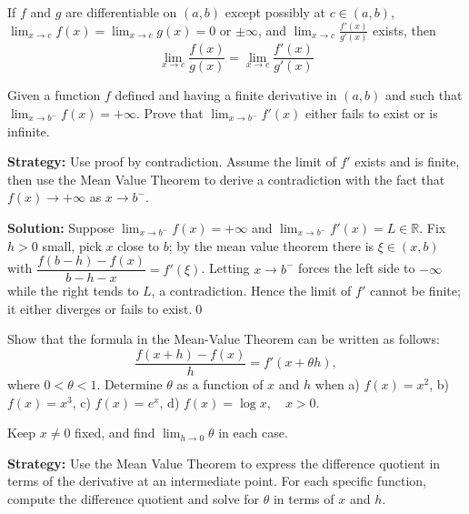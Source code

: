 \begin{theorem}
If $f$ and $g$ are differentiable on $(a,b)$ except possibly at $c \in (a,b)$, $\lim_{x \to c} f(x) = \lim_{x \to c} g(x) = 0$ or $\pm\infty$, and $\lim_{x \to c} \frac{f'(x)}{g'(x)}$ exists, then
\[ \lim_{x \to c} \frac{f(x)}{g(x)} = \lim_{x \to c} \frac{f'(x)}{g'(x)} \]
\end{theorem}

\begin{problembox}
\begin{problemstatement}
Given a function \( f \) defined and having a finite derivative in \( (a, b) \) and such that \( \lim_{x \to b^-} f(x) = +\infty \). Prove that \( \lim_{x \to b^-} f'(x) \) either fails to exist or is infinite.
\end{problemstatement}
\end{problembox}

\noindent\textbf{Strategy:} Use proof by contradiction. Assume the limit of \( f' \) exists and is finite, then use the Mean Value Theorem to derive a contradiction with the fact that \( f(x) \to +\infty \) as \( x \to b^- \).

\bigskip\noindent\textbf{Solution:}
Suppose $\lim_{x\to b^-}f(x)=+\infty$ and $\lim_{x\to b^-}f'(x)=L\in\mathbb{R}$. Fix $h>0$ small, pick $x$ close to $b$; by the mean value theorem there is $\xi\in(x,b)$ with $\dfrac{f(b-h)-f(x)}{b-h-x}=f'(\xi)$. Letting $x\to b^-$ forces the left side to $-\infty$ while the right tends to $L$, a contradiction. Hence the limit of $f'$ cannot be finite; it either diverges or fails to exist.\qed


\begin{problembox}
\begin{problemstatement}
Show that the formula in the Mean-Value Theorem can be written as follows:
\[ \frac{f(x+h)-f(x)}{h} = f'(x+\theta h), \]
where \( 0 < \theta < 1 \). Determine \( \theta \) as a function of \( x \) and \( h \) when 
a) \( f(x) = x^2 \), 
b) \( f(x) = x^3 \), 
c) \( f(x) = e^x \), 
d) \( f(x) = \log x, \quad x > 0 \).

Keep \( x \neq 0 \) fixed, and find \( \lim_{h \to 0} \theta \) in each case.
\end{problemstatement}
\end{problembox}

\noindent\textbf{Strategy:} Use the Mean Value Theorem to express the difference quotient in terms of the derivative at an intermediate point. For each specific function, compute the difference quotient and solve for \( \theta \) in terms of \( x \) and \( h \).

